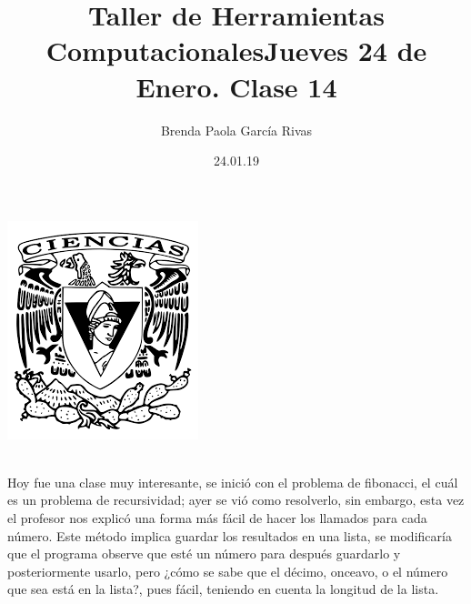 \documentclass{article}
\title{\huge \color{red}Taller de Herramientas Computacionales}
\author{Brenda Paola García Rivas}
\date{24.01.19}
\begin{document}
	\maketitle
	\begin{center}
		\includegraphics [scale=1.5]{1.png}
	\end{center}

	\newpage
	\title{\huge Jueves 24 de Enero. Clase 14}\\
	
	Hoy fue una clase muy interesante, se inició con el problema de fibonacci, el cuál es un problema de recursividad; ayer se vió como resolverlo, sin embargo, esta vez el profesor nos explicó una forma más fácil de hacer los llamados para cada número. 
	Este método implica guardar los resultados en una lista, se modificaría que el programa observe que esté un número para después guardarlo y posteriormente usarlo, pero ¿cómo se sabe que el décimo, onceavo, o el número que sea está en la lista?, pues fácil, teniendo en cuenta la longitud de la lista.
\end{document}
